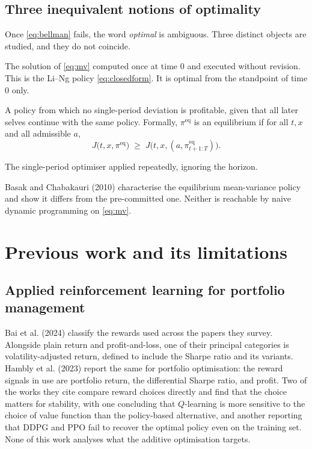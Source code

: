 \documentclass[11pt,a4paper]{article}
\theoremstyle{plain}
\theoremstyle{definition}
\newcommand{\pieq}{\pi^{\mathrm{eq}}}
\begin{document}
\subsection{Three inequivalent notions of optimality}

Once \eqref{eq:bellman} fails, the word \emph{optimal} is ambiguous. Three distinct
objects are studied, and they do not coincide.

\begin{description}[leftmargin=1.4em,style=nextline,itemsep=0.3em]
\item[Pre-committed.] The solution of \eqref{eq:mv} computed once at time $0$ and
executed without revision. This is the Li--Ng policy \eqref{eq:closedform}. It is
optimal from the standpoint of time $0$ only.
\item[Equilibrium (consistent planning).] A policy from which no single-period
deviation is profitable, given that all later selves continue with the same policy.
Formally, $\pieq$ is an equilibrium if for all $t,x$ and all admissible $a$,
\begin{equation}
J\bigl(t,x,\pieq\bigr)\;\ge\;J\bigl(t,x,(a,\pieq_{t+1:T})\bigr).
\label{eq:equilibrium}
\end{equation}
\item[Myopic.] The single-period optimiser applied repeatedly, ignoring the horizon.
\end{description}

\noindent
Basak and Chabakauri (2010) characterise the equilibrium mean-variance policy and show it
differs from the pre-committed one. Neither is reachable by naive dynamic programming
on \eqref{eq:mv}.

\section{Previous work and its limitations}

\subsection{Applied reinforcement learning for portfolio management}

Bai et al. (2024) classify the rewards used across the papers they survey. Alongside
plain return and profit-and-loss, one of their principal categories is
volatility-adjusted return, defined to include the Sharpe ratio and its variants.
Hambly et al. (2023) report the same for portfolio optimisation: the reward signals
in use are portfolio return, the differential Sharpe ratio, and profit. Two of the works
they cite compare reward choices directly and find that the choice matters for
stability, with one concluding that $Q$-learning is more sensitive to the choice of
value function than the policy-based alternative, and another reporting that DDPG and
PPO fail to recover the optimal policy even on the training set. None of this work
analyses what the additive optimisation targets.
\end{document}
